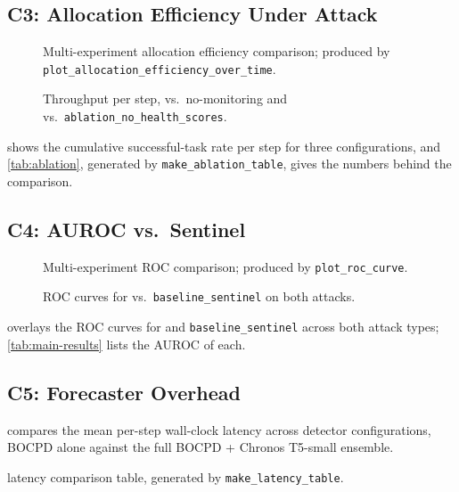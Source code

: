 \subsection{C3: Allocation Efficiency Under Attack}
\label{sec:results:c3}

\begin{figure}[tbp]
  \centering
    {Multi-experiment allocation efficiency comparison; produced by
    \texttt{plot\_allocation\_efficiency\_over\_time}.}
  \caption{Throughput per step, \sys{} vs.\ no-monitoring and vs.\
  \texttt{ablation\_no\_health\_scores}.}
  \label{fig:alloc-eff}
\end{figure}

 shows the cumulative successful-task rate per
step for three configurations, and \cref{tab:ablation}, generated by
\texttt{make\_ablation\_table}, gives the numbers behind the
comparison.

\subsection{C4: AUROC vs.\ Sentinel}
\label{sec:results:c4}

\begin{figure}[tbp]
  \centering
    {Multi-experiment ROC comparison; produced by
    \texttt{plot\_roc\_curve}.}
  \caption{ROC curves for \sys{} vs.\ \texttt{baseline\_sentinel} on
  both attacks.}
  \label{fig:roc}
\end{figure}

 overlays the ROC curves for \sys{} and
\texttt{baseline\_sentinel} across both attack types;
\cref{tab:main-results} lists the AUROC of each.

\subsection{C5: Forecaster Overhead}
\label{sec:results:c5}

 compares the mean per-step wall-clock latency
across detector configurations, BOCPD alone against the full
BOCPD + Chronos T5-small ensemble.

\begin{table}[tbp]
  \centering
  \caption{Per-step detector latency (ms). Lower is better. Generated
  by \texttt{make\_latency\_table}.}
  \label{tab:latency}
    {latency comparison table, generated by
    \texttt{make\_latency\_table}.}
\end{table}

